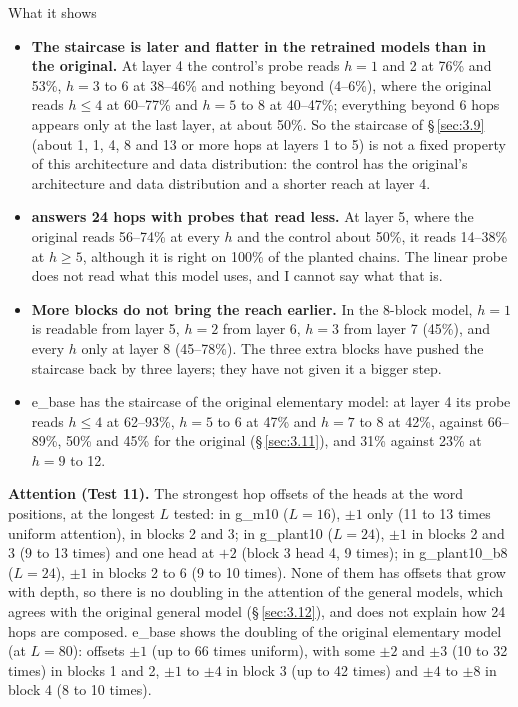 \documentclass[paper=a4,fontsize=11pt,DIV=11,parskip=half,headings=small,numbers=noendperiod]{scrartcl}
\DeclareRobustCommand{\lead}[1]{\textsf{\bfseries\color{accent}#1}}
\DeclareRobustCommand{\code}[1]{{\fontseries{m}\ttfamily #1}}
\begin{document}
\begin{findbox}{What it shows}
\begin{itemize}
\item \lead{The staircase is later and flatter in the retrained models than in the original.} At layer 4 the
  control’s probe reads $h=1$ and 2 at 76\% and 53\%, $h=3$ to 6 at 38–46\% and nothing beyond (4–6\%), where
  the original reads $h\le4$ at 60–77\% and $h=5$ to 8 at 40–47\%; everything beyond 6 hops appears only at the
  last layer, at about 50\%. So the staircase of \S\,\ref{sec:3.9} (about 1, 1, 4, 8 and 13 or more hops at
  layers 1 to 5) is not a fixed property of this architecture and data distribution: the control has the
  original’s architecture and data distribution and a shorter reach at layer 4.
\item \lead{\code{g\_\allowbreak{}plant10} answers 24 hops with probes that read less.} At layer 5, where the
  original reads 56–74\% at every $h$ and the control about 50\%, it reads 14–38\% at $h\ge5$, although it is
  right on 100\% of the planted chains. The linear probe does not read what this model uses, and I cannot say
  what that is.
\item \lead{More blocks do not bring the reach earlier.} In the 8-block model, $h=1$ is readable from layer 5,
  $h=2$ from layer 6, $h=3$ from layer 7 (45\%), and every $h$ only at layer 8 (45–78\%). The three extra blocks
  have pushed the staircase back by three layers; they have not given it a bigger step.
\item \code{e\_\allowbreak{}base} has the staircase of the original elementary model: at layer 4 its probe reads
  $h\le4$ at 62–93\%, $h=5$ to 6 at 47\% and $h=7$ to 8 at 42\%, against 66–89\%, 50\% and 45\% for the original
  (\S\,\ref{sec:3.11}), and 31\% against 23\% at $h=9$ to 12.
\end{itemize}
\end{findbox}

\lead{Attention (Test 11).} The strongest hop offsets of the heads at the word positions, at the longest $L$
tested: in \code{g\_\allowbreak{}m10} ($L=16$), $\pm1$ only (11 to 13 times uniform attention), in blocks 2 and
3; in \code{g\_\allowbreak{}plant10} ($L=24$), $\pm1$ in blocks 2 and 3 (9 to 13 times) and one head at $+2$
(block 3 head 4, 9 times); in \code{g\_\allowbreak{}plant10\_\allowbreak{}b8} ($L=24$), $\pm1$ in blocks 2 to 6
(9 to 10 times). None of them has offsets that grow with depth, so there is no doubling in the attention of the
general models, which agrees with the original general model (\S\,\ref{sec:3.12}), and does not explain how 24
hops are composed. \code{e\_\allowbreak{}base} shows the doubling of the original elementary model (at $L=80$):
offsets $\pm1$ (up to 66 times uniform), with some $\pm2$ and $\pm3$ (10 to 32 times) in blocks 1 and 2, $\pm1$
to $\pm4$ in block 3 (up to 42 times) and $\pm4$ to $\pm8$ in block 4 (8 to 10 times).
\end{document}
